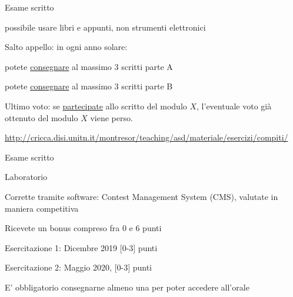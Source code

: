 \begin{frame}{Esame scritto}

\vspace{-9pt}
\begin{myboxtitle}
\BI
\item \EE possibile usare libri e appunti, non strumenti elettronici
\EI
\end{myboxtitle}

\begin{myboxtitle}[Regole]
\BI
\item \alert{Salto appello}: in ogni anno solare:
\BI
\item potete \underline{consegnare} al massimo \alert{3} scritti parte A
\item potete \underline{consegnare} al massimo \alert{3} scritti parte B
\EI
\item \alert{Ultimo voto}: se \underline{partecipate} allo scritto del modulo $X$, l'eventuale voto già ottenuto del modulo $X$ viene perso.
\EI
\end{myboxtitle}

\begin{myboxtitle}
\small
\url{http://cricca.disi.unitn.it/montresor/teaching/asd/materiale/esercizi/compiti/}
\end{myboxtitle}

\end{frame}
\begin{frame}{Esame scritto}
\vspace{-15pt}
\end{frame}
\begin{frame}{Laboratorio}
	
\vspace{-9pt}
\begin{myboxtitle}
\BI
\item Corrette tramite software: Contest Management System (CMS), valutate in maniera competitiva
\item Ricevete un bonus compreso fra 0 e 6 punti
\BI
\item Esercitazione 1: Dicembre 2019 [0-3] punti
\item Esercitazione 2: Maggio 2020, [0-3] punti
\EI
\item E' obbligatorio consegnarne almeno una per poter accedere all'orale 
\EI
\end{myboxtitle}

\end{frame}

